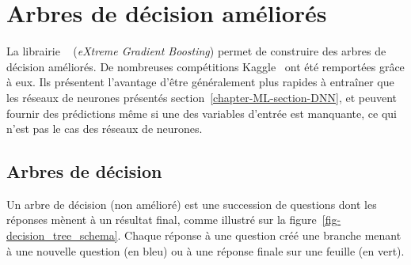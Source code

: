 \section{Arbres de décision améliorés}\label{chapter-ML-section-XGB}
La librairie
\XGBOOST~\cite{xgboost}
(\emph{eXtreme Gradient Boosting})
permet de construire des
arbres de décision améliorés.
De nombreuses compétitions Kaggle~\cite{kaggle_challenge} ont été remportées grâce à eux.
Ils présentent l'avantage d'être généralement plus rapides à entraîner que les réseaux de neurones présentés section~\ref{chapter-ML-section-DNN},
et peuvent fournir des prédictions même si une des variables d'entrée est manquante, ce qui n'est pas le cas des réseaux de neurones.
\subsection{Arbres de décision}\label{chapter-ML-section-XGB-decision_trees}
Un arbre de décision (non amélioré) est une succession de questions
dont les réponses mènent à un résultat final,
comme illustré sur la figure~\ref{fig-decision_tree_schema}.
Chaque réponse à une question créé une \og branche \fg{} menant à une nouvelle question (en bleu)
ou à une réponse finale sur une \og feuille \fg{} (en vert).
